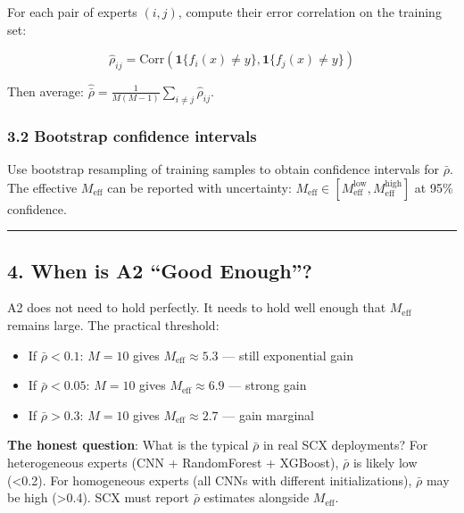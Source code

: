 \documentclass[
  12pt,
]{article}
\begin{document}
For each pair of experts \((i, j)\), compute their error correlation on the training set:

\begin{equation}
\hat{\rho}_{ij} = \text{Corr}(\mathbf{1}\{f_i(x) \neq y\}, \mathbf{1}\{f_j(x) \neq y\})
\end{equation}

Then average: \(\hat{\bar{\rho}} = \frac{1}{M(M-1)}\sum_{i\neq j}\hat{\rho}_{ij}\).

\subsubsection{3.2 Bootstrap confidence intervals}\label{bootstrap-confidence-intervals}

Use bootstrap resampling of training samples to obtain confidence intervals for \(\bar{\rho}\). The effective \(M_{\text{eff}}\) can be reported with uncertainty: \(M_{\text{eff}} \in [M_{\text{eff}}^{\text{low}}, M_{\text{eff}}^{\text{high}}]\) at 95\% confidence.

\begin{center}\rule{0.5\linewidth}{0.5pt}\end{center}

\subsection{4. When is A2 ``Good Enough''?}\label{when-is-a2-good-enough}

A2 does not need to hold perfectly. It needs to hold well enough that \(M_{\text{eff}}\) remains large. The practical threshold:

\begin{itemize}
\item If \(\bar{\rho} < 0.1\): \(M=10\) gives \(M_{\text{eff}} \approx 5.3\) — still exponential gain
\item If \(\bar{\rho} < 0.05\): \(M=10\) gives \(M_{\text{eff}} \approx 6.9\) — strong gain
\item If \(\bar{\rho} > 0.3\): \(M=10\) gives \(M_{\text{eff}} \approx 2.7\) — gain marginal
\end{itemize}

\textbf{The honest question}: What is the typical \(\bar{\rho}\) in real SCX deployments? For heterogeneous experts (CNN + RandomForest + XGBoost), \(\bar{\rho}\) is likely low (<0.2). For homogeneous experts (all CNNs with different initializations), \(\bar{\rho}\) may be high (>0.4). SCX must report \(\bar{\rho}\) estimates alongside \(M_{\text{eff}}\).
\end{document}

